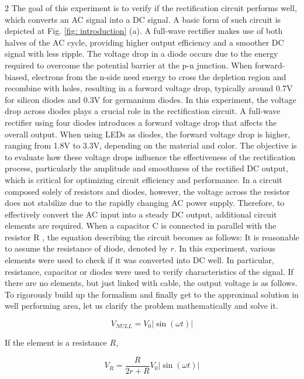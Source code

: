 \documentclass{article}
\begin{document}
\begin{multicols}{2}
The goal of this experiment is to verify if the rectification circuit performs well, which converts an AC signal into a DC signal. A basic form of such circuit is depicted at Fig. \ref{fig: introduction} (a). 
A full-wave rectifier makes use of both halves of the AC cycle, providing higher output efficiency and a smoother DC signal with less ripple.
The voltage drop in a diode occurs due to the energy required to overcome the potential barrier at the p-n junction.
When forward-biased, electrons from the n-side need energy to cross the depletion region and recombine with holes, resulting in a forward voltage drop, typically around 0.7V for silicon diodes and 0.3V for germanium diodes.
In this experiment, the voltage drop across diodes plays a crucial role in the rectification circuit.
A full-wave rectifier using four diodes introduces a forward voltage drop that affects the overall output.
When using LEDs as diodes, the forward voltage drop is higher, ranging from 1.8V to 3.3V, depending on the material and color.
The objective is to evaluate how these voltage drops influence the effectiveness of the rectification process, particularly the amplitude and smoothness of the rectified DC output, which is critical for optimizing circuit efficiency and performance.
In a circuit composed solely of resistors and diodes, however, the voltage across the resistor does not stabilize due to the rapidly changing AC power supply.
Therefore, to effectively convert the AC input into a steady DC output, additional circuit elements are required. When a capacitor  C  is connected in parallel with the resistor  R , the equation describing the circuit becomes as follows:
It is reasonable to assume the resistance of diode, denoted by $r$.
In this experiment, various elements were used to check if it was converted into DC well.
In particular, resistance, capacitor or diodes were used to verify  characteristics of the signal.
If there are no elements, but just linked with cable, the output voltage is as follows.
To rigorously build up the formalism and finally get to the approximal solution in well performing area, let us clarify the problem mathematically and solve it.

\begin{equation}
    V_{NULL}  = V_0 \left|\sin(\omega t)\right|
\end{equation}

If the element is a resistance $R$, 

\begin{equation}
    V_R = \frac{R}{2r+R} V_0\left|\sin(\omega t)\right|
\end{equation}


\end{multicols}
\end{document}

